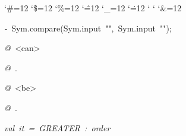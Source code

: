 \begin{list}{}
{\setlength{\leftmargin}{\leftmargini}
\setlength{\rightmargin}{0cm}
\setlength{\itemindent}{0cm}
\setlength{\listparindent}{0cm}
\setlength{\itemsep}{0cm}
\setlength{\parsep}{0cm}
\setlength{\labelsep}{0cm}
\setlength{\labelwidth}{0cm}
\catcode`\#=12
\catcode`\$=12
\catcode`\%=12
\catcode`\^=12
\catcode`\_=12
\catcode`\.=12
\catcode`
\catcode`
\catcode`\&=12
\ttfamily}
\small
\item[]\textsl{-\ }Sym.compare(Sym.input\ "",\ Sym.input\ "");
\item[]\textsl{@\ }<can>
\item[]\textsl{@\ }.
\item[]\textsl{@\ }<be>
\item[]\textsl{@\ }.
\item[]\textsl{val\ it\ =\ GREATER\ :\ order}
\end{list}
